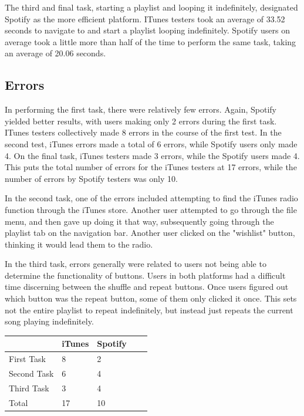 \documentclass[12pt]{report}
\begin{document}
The third and final task, starting a playlist and looping it indefinitely, designated Spotify as the more efficient platform. ITunes testers took an average of 33.52 seconds to navigate to and start a playlist looping indefinitely. Spotify users on average took a little more than half of the time to perform the same task, taking an average of 20.06 seconds.

\subsection{Errors}

In performing the first task, there were relatively few errors. Again, Spotify yielded better results, with users making only 2 errors during the first task. ITunes testers collectively made 8 errors in the course of the first test. In the second test, iTunes errors made a total of 6 errors, while Spotify users only made 4. On the final task, iTunes testers made 3 errors, while the Spotify users made 4. This puts the total number of errors for the iTunes testers at 17 errors, while the number of errors by Spotify testers was only 10.

In the second task, one of the errors included attempting to find the iTunes radio function through the iTunes store. Another user attempted to go through the file menu, and then gave up doing it that way, subsequently going through the playlist tab on the navigation bar. Another user clicked on the "wishlist" button, thinking it would lead them to the radio.

In the third task, errors generally were related to users not being able to determine the functionality of buttons. Users in both platforms had a difficult time discerning between the shuffle and repeat buttons. Once users figured out which button was the repeat button, some of them only clicked it once. This sets not the entire playlist to repeat indefinitely, but instead just repeats the current song playing indefinitely.

\begin{table}[h]
\centering
\begin{tabular}{lllll}
\hline
            & iTunes & Spotify &  &  \\ \hline
First Task  & 8      & 2       &  &  \\
Second Task & 6      & 4       &  &  \\
Third Task  & 3      & 4       &  &  \\ \hline
Total       & 17     & 10      &  & 
\end{tabular}
\end{table}
\end{document}
